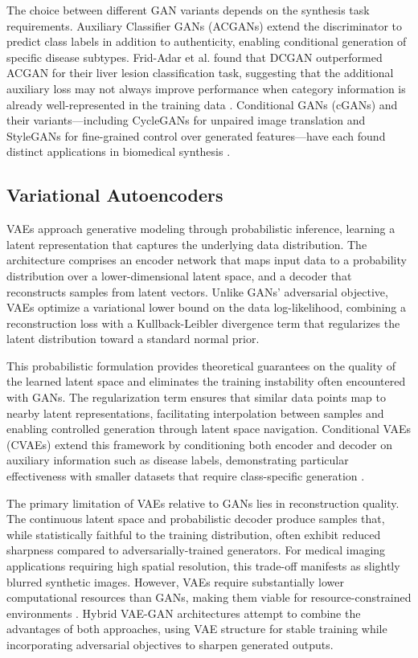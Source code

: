The choice between different GAN variants depends on the synthesis task requirements. Auxiliary Classifier GANs (ACGANs) extend the discriminator to predict class labels in addition to authenticity, enabling conditional generation of specific disease subtypes. Frid-Adar et al. found that DCGAN outperformed ACGAN for their liver lesion classification task, suggesting that the additional auxiliary loss may not always improve performance when category information is already well-represented in the training data \cite{fridadar2018gan}. Conditional GANs (cGANs) and their variants---including CycleGANs for unpaired image translation and StyleGANs for fine-grained control over generated features---have each found distinct applications in biomedical synthesis \cite{mendes2025synthetic}.

\subsection{Variational Autoencoders}

VAEs approach generative modeling through probabilistic inference, learning a latent representation that captures the underlying data distribution. The architecture comprises an encoder network that maps input data to a probability distribution over a lower-dimensional latent space, and a decoder that reconstructs samples from latent vectors. Unlike GANs' adversarial objective, VAEs optimize a variational lower bound on the data log-likelihood, combining a reconstruction loss with a Kullback-Leibler divergence term that regularizes the latent distribution toward a standard normal prior.

This probabilistic formulation provides theoretical guarantees on the quality of the learned latent space and eliminates the training instability often encountered with GANs. The regularization term ensures that similar data points map to nearby latent representations, facilitating interpolation between samples and enabling controlled generation through latent space navigation. Conditional VAEs (CVAEs) extend this framework by conditioning both encoder and decoder on auxiliary information such as disease labels, demonstrating particular effectiveness with smaller datasets that require class-specific generation \cite{mendes2025synthetic}.

The primary limitation of VAEs relative to GANs lies in reconstruction quality. The continuous latent space and probabilistic decoder produce samples that, while statistically faithful to the training distribution, often exhibit reduced sharpness compared to adversarially-trained generators. For medical imaging applications requiring high spatial resolution, this trade-off manifests as slightly blurred synthetic images. However, VAEs require substantially lower computational resources than GANs, making them viable for resource-constrained environments \cite{mendes2025synthetic}. Hybrid VAE-GAN architectures attempt to combine the advantages of both approaches, using VAE structure for stable training while incorporating adversarial objectives to sharpen generated outputs.

